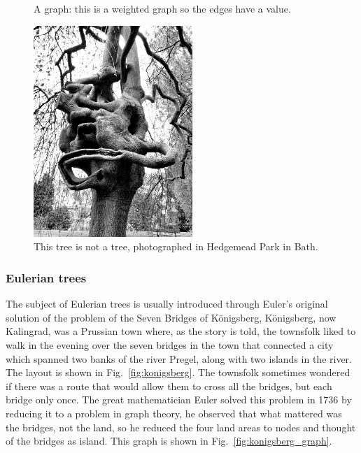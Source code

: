 \documentclass[11pt,a4paper]{scrartcl}
\begin{document}
\begin{figure}
\begin{center}
\end{center}
\caption{A graph: this is a weighted graph so the edges have a value. \label{fig:wei_graph}}
\end{figure}

  

\begin{figure}
\begin{center}
\includegraphics[width=6cm]{not_a_tree_bw.jpg}
\end{center}
\caption{This tree is not a tree, photographed in Hedgemead Park in Bath.\label{fig:not_a_tree}}
\end{figure}

\subsubsection*{Eulerian trees}

The subject of Eulerian trees is usually introduced through Euler's
original solution of the problem of the Seven Bridges of K\"onigsberg,
K\"{o}nigsberg, now Kalingrad, was a Prussian town where, as the story
is told, the townsfolk liked to walk in the evening over the seven
bridges in the town that connected a city which spanned two banks of
the river Pregel, along with two islands in the river. The layout is
shown in Fig.~\ref{fig:konigsberg}. The townsfolk sometimes wondered
if there was a route that would allow them to cross all the bridges,
but each bridge only once. The great mathematician Euler solved this
problem in 1736 by reducing it to a problem in graph theory, he
observed that what mattered was the bridges, not the land, so he
reduced the four land areas to nodes and thought of the bridges as
island. This graph is shown in Fig.~\ref{fig:konigsberg_graph}.
\end{document}

